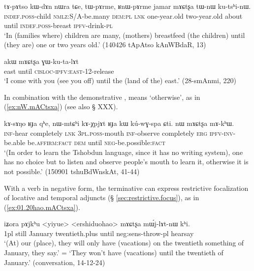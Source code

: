 \begin{exe}
\ex \label{ex:RnWpArme.mACtsxa}
 \gll tɤ-pɤtso kɯ-dɤn nɯra tɕe, tɯ-pɤrme, ʁnɯ-pɤrme jamar mɤɕtʂa tɯ-nɯ ku-tsʰi-nɯ. \\
 \textsc{indef}.\textsc{poss}-child \textsc{nmlz}:S/A-be.many \textsc{dem}:\textsc{pl} \textsc{lnk} one-year.old two-year.old about until \textsc{indef}.\textsc{poss}-breast \textsc{ipfv}-drink-\textsc{pl} \\
 \glt `In (families where) children are many, (mothers) breastfeed (the children) until (they are) one or two years old.' (140426 tApAtso kAnWBdaR, 13)
\end{exe}

\begin{exe}
\ex \label{ex:akW.mACtsxa}
 \gll akɯ mɤɕtʂa ɣɯ-ku-ta-lɤt \\ 
east until \textsc{cisloc}-\textsc{ipfv}:\textsc{east}-1\fl{}2-release \\
\glt  `I come with you (see you off) until the (land of the) east.' (28-smAnmi, 220)
\end{exe}

In combination with the demonstrative ,  means `otherwise', as in (\ref{ex:nW.mACtsxa}) (see also § XXX).

\begin{exe}
\ex \label{ex:nW.mACtsxa}
 \gll   kɤ-sɤŋo ʁɟa qʰe,  nɯ-mtɕʰi kɤ-χpjɤt ʁɟa kɯ kú-wɣ-spa ɕti.  nɯ mɤɕtʂa mɤ-kʰɯ. \\
 \textsc{inf}-hear completely \textsc{lnk} \textsc{3pl}.\textsc{poss}-mouth \textsc{inf}-observe completely \textsc{erg} \textsc{ipfv}-\textsc{inv}-be.able be.\textsc{affirm}:\textsc{fact} \textsc{dem} until \textsc{neg}-be.possible:\textsc{fact} \\
\glt `(In order to learn the Tshobdun language, since it has no writing system), one has no choice but to listen and observe people's mouth to learn it, otherwise it is not possible.' (150901 tshuBdWnskAt, 41-44)
\end{exe}

With a verb in negative form, the terminative can express restrictive focalization of locative and temporal adjuncts (§ \ref{sec:restrictive.focus}), as in (\ref{ex:01.20hao.mACtsxa}).

\begin{exe}
\ex \label{ex:01.20hao.mACtsxa}
 \gll  iʑora pɤjkʰu <yiyue> <ershiduohao> mɤɕtʂa mɯ́j-lɤt-nɯ kʰi. \\
 1pl still January twentieth.plus until neg:sens-throw-pl hearsay \\
 \glt `(At) our (place), they will only have (vacations) on the twentieth something of January, they say.' = `They won't have (vacations) until the twentieth of January.' (conversation, 14-12-24)
 \end{exe}
 
